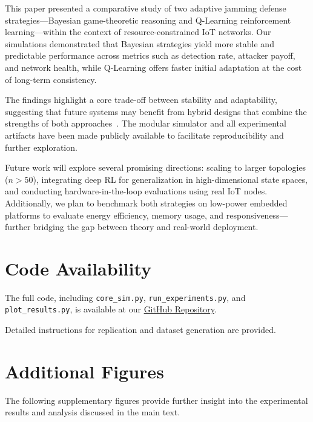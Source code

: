 \documentclass[conference]{IEEEtran}
\begin{document}
This paper presented a comparative study of two adaptive jamming defense strategies—Bayesian game-theoretic reasoning and Q-Learning reinforcement learning—within the context of resource-constrained IoT networks. Our simulations demonstrated that Bayesian strategies yield more stable and predictable performance across metrics such as detection rate, attacker payoff, and network health, while Q-Learning offers faster initial adaptation at the cost of long-term consistency.

The findings highlight a core trade-off between stability and adaptability, suggesting that future systems may benefit from hybrid designs that combine the strengths of both approaches~\cite{khoury2020hybrid}. The modular simulator and all experimental artifacts have been made publicly available to facilitate reproducibility and further exploration.

Future work will explore several promising directions: scaling to larger topologies ($n > 50$), integrating deep RL for generalization in high-dimensional state spaces, and conducting hardware-in-the-loop evaluations using real IoT nodes. Additionally, we plan to benchmark both strategies on low-power embedded platforms to evaluate energy efficiency, memory usage, and responsiveness—further bridging the gap between theory and real-world deployment.

\section*{Code Availability}
The full code, including \texttt{core\_sim.py}, \texttt{run\_experiments.py}, and \texttt{plot\_results.py}, is available at our \href{https://github.com/UmarYaksambi/Adaptive-Defense-Wireless-Networks}{GitHub Repository}.

Detailed instructions for replication and dataset generation are provided.

\appendix
\section{Additional Figures}
The following supplementary figures provide further insight into the experimental results and analysis discussed in the main text.
\end{document}
